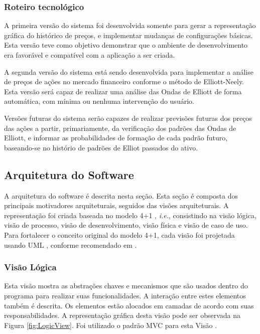 \documentclass[12pt]{article}
\begin{document}
\subsubsection{Roteiro tecnológico}

A primeira versão do sistema foi desenvolvida somente para gerar a representação gráfica
do histórico de preços, e implementar mudanças de configurações básicas. Esta versão teve
como objetivo demonstrar que o ambiente de desenvolvimento era favorável e compatível
com a aplicação a ser criada.

A segunda versão do sistema está sendo desenvolvida para implementar a análise de preços
de ações no mercado financeiro conforme o método de Elliott-Neely. Esta versão será capaz
de realizar uma análise das Ondas de Elliott de forma automática, com mínima ou nenhuma
intervenção do usuário.

Versões futuras do sistema serão capazes de realizar previsões futuras dos preços das ações
a partir, primariamente, da verificação dos padrões das Ondas de Elliott, e informar as
probabilidades  de formação de cada padrão futuro, baseando-se no histório de padrões de
Elliot passados do ativo.

\subsection{Arquitetura do Software}

A arquitetura do software é descrita nesta seção. Esta seção é composta dos principais
motivadores arquiteturais, seguidos das visões arquiteturais. A representação foi criada
baseada no modelo 4+1 \cite{Kruchten:1995}, \emph{i.e.}, consistindo na visão lógica,
visão de processo, visão de desenvolvimento, visão física e visão de caso de uso.
Para fortalecer o conceito original do modelo 4+1, cada visão foi projetada usando
UML \cite{UML}, conforme recomendado em \cite{FCG:2007}.

\subsubsection{Visão Lógica}

Esta visão mostra as abstrações chaves e mecanismos que são usados dentro do programa
para realizar suas funcionalidades. A interação entre estes elementos também é descrita.
Os elementos estão alocados em camadas de acordo com suas responsabilidades. A representação 
gráfica desta visão pode ser observada na Figura \ref{fig:LogicView}. Foi utilizado o
padrão MVC para esta Visão \cite{KrasnerPope:1988} \cite{Buschmann:1988}.
\end{document}
